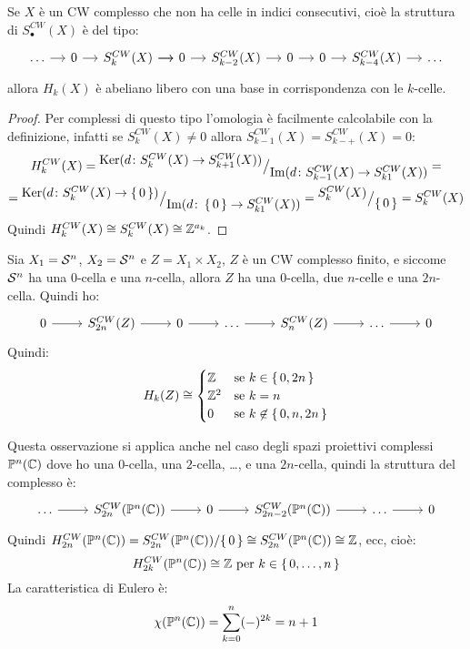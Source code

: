 \begin{osservation}
  Se $ X $ è un CW complesso che non ha celle in indici consecutivi,
  cioè la struttura di $ S_\bullet^{CW}(X) $ è del tipo:
  \[
    \begin{tikzcd}[nodes = {column sep = 12pt}]
      \dots \rar & \rar 0 & \rar S_k^{CW}(X) \rar & 0 \rar &   S_{k-2}^{CW}(X) \rar & 0 \rar & 0 \rar & S_{k-4}^{CW}(X) \rar & \dots
    \end{tikzcd}
  \]
  allora $ H_k(X) $ è abeliano libero con una base in corrispondenza
  con le $ k $-celle.
\end{osservation}
\begin{proof}
  Per complessi di questo tipo l'omologia è facilmente calcolabile
  con la definizione, infatti se $ S_k^{CW}(X) \not = 0 $ allora
  $ S_{k-1}^{CW}(X) = S_{k-+}^{CW}(X) = 0 $:
  \begin{gather*}
    H^{CW}_k(X) = {^{\textstyle \mathrm{Ker}( d \colon  S_k^{CW}(X) \to  S_{k+1}^{CW}(X))}\big/_{\textstyle \mathrm{Im}( d \colon  S_{k-1}^{CW}(X) \to  S_{k1}^{CW}(X) )}} = \\
    =   {^{\textstyle \mathrm{Ker}( d \colon  S_k^{CW}(X) \to \set{0})}\big/_{\textstyle \mathrm{Im}( d \colon  \set{0} \to  S_{k1}^{CW}(X) )}} = {^{\textstyle S_k^{CW}(X)}\big/_{\textstyle \set{0}}} = S_k^{CW}(X)
  \end{gather*}
  Quindi $ H^{CW}_k(X) \cong S_k^{CW}(X) \cong \mathbb{Z}^{a_k} $.
\end{proof}
\begin{example}
  Sia $ X_1 = \mathcal{S}^{n} $, $ X_2 = \mathcal{S}^{n} $ e $ Z = X_1 \times X_2 $, $ Z $ è un CW
  complesso finito, e siccome $ \mathcal{S}^{n} $ ha una $ 0 $-cella e una $ n $-cella,
  allora $ Z $ ha una $ 0 $-cella, due $ n $-celle e una $ 2n $-cella.
  Quindi ho:
  \[
    \begin{tikzcd}
      0 \rar & S_{2n}^{CW}(Z) \rar & 0 \rar & \dots \rar & S_n^{CW}(Z) \rar & \dots \rar & 0
    \end{tikzcd}
  \]
  Quindi:
  \[
    H_k(Z) \cong
    \begin{cases}
      \mathbb{Z} & \text{se } k \in \set{0, 2n} \\
      \mathbb{Z}^2 & \text{se } k = n \\
      0 & \text{se } k \not \in \set{0, n, 2n}
    \end{cases}
  \]
\end{example}

Questa osservazione si applica anche nel caso degli spazi
proiettivi complessi $ \mathbb{P}^{n} (\mathbb{C}) $ dove ho una $ 0 $-cella, una $ 2 $-cella, \dots, e
una $ 2n $-cella, quindi la struttura del complesso è:
\[
  \begin{tikzcd}
    \dots \rar & S^{CW}_{2n}(\Pjc{n}) \rar & 0 \rar & S_{2n - 2}^{CW}(\Pjc{n}) \rar & \dots \rar & 0
  \end{tikzcd}
\]
Quindi $ H_{2n}^{CW}(\mathbb{P}^{n} (\mathbb{C})) = {S^{CW}_{2n}(\mathbb{P}^{n} (\mathbb{C}))} \slash {\set{0}} \cong S_{2n}^{CW}(\mathbb{P}^{n} (\mathbb{C})) \cong \mathbb{Z} $,
ecc, cioè:
\[
  H_{2k}^{CW}(\mathbb{P}^{n} (\mathbb{C})) \cong \mathbb{Z} \text{ per } k \in \set{0, \dots, n}
\]
La caratteristica di Eulero è:
\[
  \chi(\mathbb{P}^{n} (\mathbb{C})) = \sum_{k=0}^n (-)^{2k} = n + 1
\]

